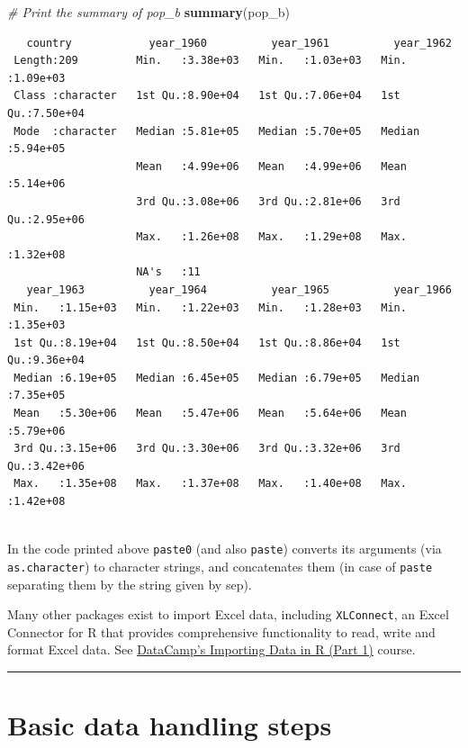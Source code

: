 \documentclass[
]{book}
\newenvironment{Shaded}{\begin{snugshade}}{\end{snugshade}}
\newcommand{\CommentTok}[1]{\textcolor[rgb]{0.56,0.35,0.01}{\textit{#1}}}
\newcommand{\KeywordTok}[1]{\textcolor[rgb]{0.13,0.29,0.53}{\textbf{#1}}}
\newcommand{\NormalTok}[1]{#1}
\begin{document}
\begin{Shaded}
\begin{Highlighting}[]
\CommentTok{# Print the summary of pop_b}
\KeywordTok{summary}\NormalTok{(pop_b)}
\end{Highlighting}
\end{Shaded}

\begin{verbatim}
   country            year_1960          year_1961          year_1962       
 Length:209         Min.   :3.38e+03   Min.   :1.03e+03   Min.   :1.09e+03  
 Class :character   1st Qu.:8.90e+04   1st Qu.:7.06e+04   1st Qu.:7.50e+04  
 Mode  :character   Median :5.81e+05   Median :5.70e+05   Median :5.94e+05  
                    Mean   :4.99e+06   Mean   :4.99e+06   Mean   :5.14e+06  
                    3rd Qu.:3.08e+06   3rd Qu.:2.81e+06   3rd Qu.:2.95e+06  
                    Max.   :1.26e+08   Max.   :1.29e+08   Max.   :1.32e+08  
                    NA's   :11                                              
   year_1963          year_1964          year_1965          year_1966       
 Min.   :1.15e+03   Min.   :1.22e+03   Min.   :1.28e+03   Min.   :1.35e+03  
 1st Qu.:8.19e+04   1st Qu.:8.50e+04   1st Qu.:8.86e+04   1st Qu.:9.36e+04  
 Median :6.19e+05   Median :6.45e+05   Median :6.79e+05   Median :7.35e+05  
 Mean   :5.30e+06   Mean   :5.47e+06   Mean   :5.64e+06   Mean   :5.79e+06  
 3rd Qu.:3.15e+06   3rd Qu.:3.30e+06   3rd Qu.:3.32e+06   3rd Qu.:3.42e+06  
 Max.   :1.35e+08   Max.   :1.37e+08   Max.   :1.40e+08   Max.   :1.42e+08  
                                                                            
\end{verbatim}

In the code printed above \texttt{paste0} (and also \texttt{paste}) converts its arguments (via \texttt{as.character}) to character strings, and concatenates them (in case of \texttt{paste} separating them by the string given by sep).

Many other packages exist to import Excel data, including \texttt{XLConnect}, an Excel Connector for R that
provides comprehensive functionality to read, write and format Excel data. See \href{https://campus.datacamp.com/courses/importing-data-in-r-part-1/}{DataCamp's Importing Data in R (Part 1)} course.

\begin{center}\rule{0.5\linewidth}{0.5pt}\end{center}

\hypertarget{basic-data-handling-steps}{%
\section{Basic data handling steps}\label{basic-data-handling-steps}}
\end{document}
